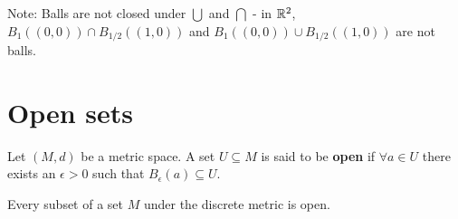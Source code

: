 Note: Balls are not closed under $\bigcup$ and $\bigcap$ - in $\mathbb R^2$, $B_{1}((0,0)) \cap B_{1/2}((1,0))$ and $B_{1}((0,0))\cup B_{1/2}((1,0))$ are not balls.

\section{Open sets} 
\begin{definition}
	Let $(M,d)$ be a metric space. A set $U \subseteq M$ is said to be {\bf open} if $\forall a\in U$ there exists an $\epsilon >0$ such that $B_\epsilon (a) \subseteq U$. 
\end{definition}
\begin{example}
	Every subset of a set $M$ under the discrete metric is open.
\end{example}

